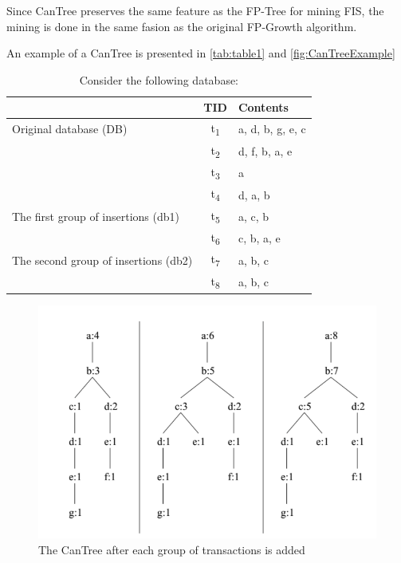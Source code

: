 Since CanTree preserves the same feature as the FP-Tree for mining FIS, the mining is done in the same fasion as the original FP-Growth algorithm.

An example of a CanTree is presented in \autoref{tab:table1} and \autoref{fig:CanTreeExample}

\begin{table}[h!]
  \begin{center}
    \caption{Consider the following database:}
    \label{tab:table1}
    \begin{tabular}{l|c|l} %
      \textbf{} & \textbf{TID} & \textbf{Contents}\\
      \hline
      Original database (DB) & t\textsubscript{1} & {a, d, b, g, e, c}\\
       & t\textsubscript{2} & {d, f, b, a, e}\\
        & t\textsubscript{3} & {a}\\
	   & t\textsubscript{4} & {d, a, b}\\
	         \hline
       The first group of insertions (db1) & t\textsubscript{5} & {a, c, b}\\
        & t\textsubscript{6} & {c, b, a, e}\\
              \hline
       The second group of insertions (db2) & t\textsubscript{7} & {a, b, c}\\
        & t\textsubscript{8} & {a, b, c} \\
    \end{tabular}
  \end{center}
\end{table}



\begin{figure}[H]
  \centering
  \includegraphics[width=\linewidth]{figures/CanTreeExample}
  \caption{The CanTree after each group of transactions is added}
  \label{fig:CanTreeExample}
\end{figure}



